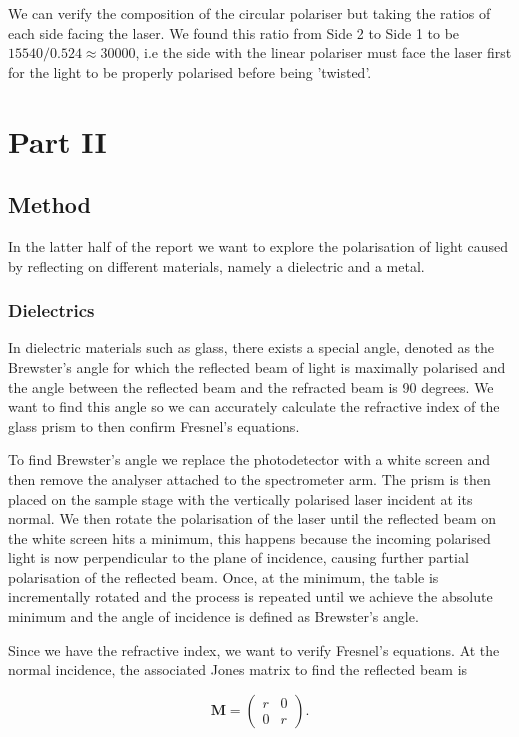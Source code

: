 \documentclass{article}
\begin{document}
We can verify the composition of the circular polariser but taking 
the ratios of each side facing the laser. We found this ratio from 
Side 2 to Side 1 to be $15540/0.524 \approx 30 000$, i.e the side 
with the linear polariser must face the laser first for the light 
to be properly polarised before being 'twisted'. 

\section{Part II}
\subsection{Method}
In the latter half of the report we want to explore the polarisation 
of light caused by reflecting on different materials, namely a 
dielectric and a metal.

\subsubsection{Dielectrics}
In dielectric materials such as glass, there exists a special angle,
denoted as the Brewster's angle for which the reflected beam of light 
is maximally polarised and the angle between the reflected beam and 
the refracted beam is 90 degrees. We want to find this angle so we can 
accurately calculate the refractive index of the glass prism to then 
confirm Fresnel's equations.

To find Brewster's angle we replace the photodetector with a white 
screen and then remove the analyser attached to the spectrometer arm.
The prism is then placed on the sample stage with the vertically 
polarised laser incident at its normal. We then rotate the polarisation 
of the laser until the reflected beam on the white screen hits a 
minimum, this happens because the incoming polarised light is now 
perpendicular to the plane of incidence, causing further partial 
polarisation of the reflected beam. Once, at the minimum, the table is 
incrementally rotated and the process is repeated until we achieve the 
absolute minimum and the angle of incidence is defined as Brewster's 
angle.

Since we have the refractive index, we want to verify Fresnel's equations.
At the normal incidence, the associated Jones matrix to find the reflected 
beam is 

\begin{equation}
    \textbf{M} = \begin{pmatrix}
        r & 0 \\
        0 & r
    \end{pmatrix}.
\end{equation}
\end{document}
